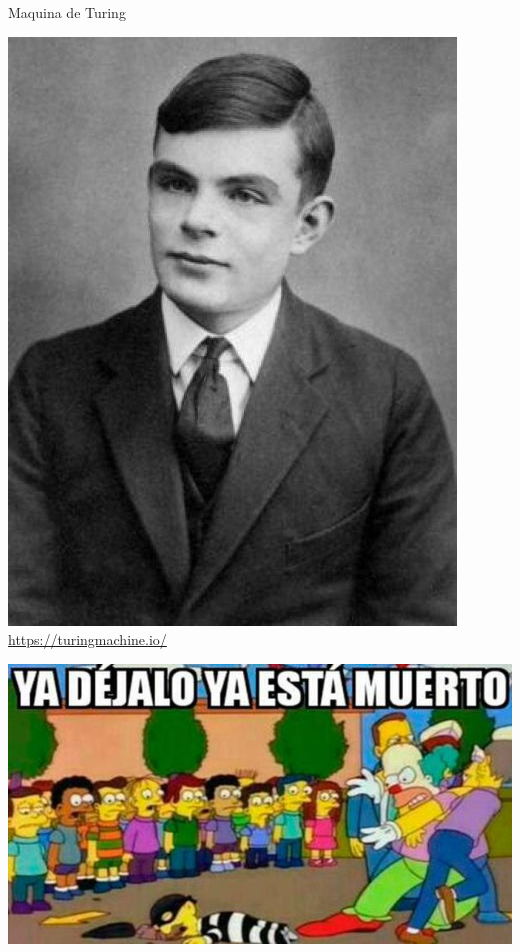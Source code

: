 \documentclass[10pt,xcolor={dvipsnames}]{beamer}
\begin{document}
\begin{frame}{Maquina de Turing}
\begin{center}
\includegraphics[scale=0.4]{Figures/Turing} \\ \pause
\url{https://turingmachine.io/}
\end{center}
\end{frame}

\begin{frame}
\begin{center}
\includegraphics[scale=0.5]{Figures/estamuerto}
\end{center}
\end{frame}
\end{document}

